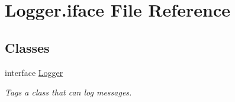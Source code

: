 \hypertarget{Logger_8iface}{\section{Logger.\-iface File Reference}
\label{Logger_8iface}
}
\subsection*{Classes}
\begin{DoxyCompactItemize}
\item 
interface \hyperlink{interfaceLogger}{Logger}
\begin{DoxyCompactList}\small\item\em Tags a class that can log messages. \end{DoxyCompactList}\end{DoxyCompactItemize}
